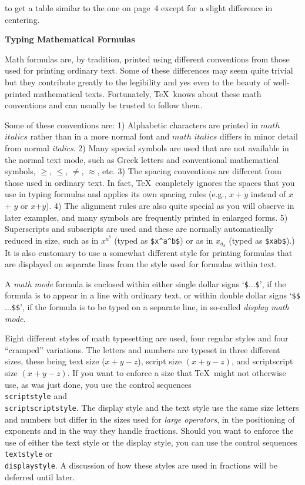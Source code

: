 to get a table similar to the one on page~4 except for
a slight difference in centering.

{\bf Typing Mathematical Formulas}

Math formulas are, by tradition, printed using different conventions from
those used for printing ordinary text. Some of these differences may seem
quite trivial but they contribute greatly to the legibility and yes even
to the beauty of well-printed mathematical texts.  Fortunately, \TeX\
knows about these math conventions and can usually be trusted to follow
them.

Some of these conventions are:
1) Alphabetic characters are
printed in $math$ $italics$ rather than in a more normal font and
$math$ $italics$ differs in minor detail from normal {\it italics}.  2)
Many special symbols are used that are not available in the normal text mode,
such as Greek letters and conventional
mathematical symbols, $\ge$, $\le$, $\ne$, $\approx$, etc. 3) The
spacing conventions are different from those used in ordinary text. In fact,
\TeX\ completely ignores the spaces that you use in typing
formulas and applies its own spacing rules (e.g.,  $x+y$ instead of
$x$ + $y$ or $x$+$y$). 4) The alignment rules are also quite special as you will
observe in later examples, and many symbols are frequently printed in enlarged forms.
5) Superscripts and subscripts are used
and these are normally automatically reduced in size, such
as in $x^{a^b}$ (typed as {\tt \$x\^{}\lbr a\^{}b\rbr\$}) or
as in $x_{a_b}$ (typed as {\tt \$x\und{}\lbr a\und{}b\rbr\$}).\quad
6) It is also customary to use a somewhat different style for printing formulas
that are displayed on separate lines from the style used for formulas within text.

A {\sl math mode} formula is enclosed within either single dollar signs
`{\tt \$$\ldots$\$}', if the formula is to appear in a line with ordinary
text, or within double dollar signs `{\tt \$\$$\ldots$\$\$}', if the
formula is to be typed on a separate line, in so-called {\sl display math
mode}.

Eight different styles of math typesetting 
are used,
four regular styles and four ``cramped'' variations.  The letters and numbers
are typeset in three different sizes, these being 
text size
(\hbox{$x+y-z$}), script size {$\scriptstyle (x+y-z)$}, and scriptscript size
{$\scriptscriptstyle (x+y-z)$}.  If you want to enforce a
size that \TeX\ might not otherwise use, as was just done, you use the
control sequences {\tt~\\scriptstyle} and {\tt~\\scriptscriptstyle}.  The
display style and the text style use the same
size letters and numbers
but differ in the sizes used for {\sl large operators}, 
in the positioning of exponents and in the way they handle fractions.
Should you want to enforce the use
of either the text style or the display style,
 you can use the control sequences
{\tt \\textstyle} or {\tt \\displaystyle}. A discussion of how these styles are
used in fractions will be deferred until later.


